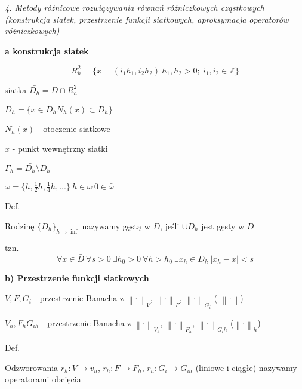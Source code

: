 \textit{4. Metody różnicowe rozwiązywania równań różniczkowych cząstkowych (konstrukcja siatek, przestrzenie funkcji siatkowych, aproksymacja operatorów różniczkowych)}

\textbf{a\) konstrukcja siatek}

\[R^{2}_{h} = \{ x = (i_{1}h_{1}, i_{2}h_{2})\ h_{1},h_{2} > 0;\ i_{1},i_{2} \in \mathbb{Z}\}\]

siatka $\bar{D_{h}} = D \cap R^{2}_{h}$

$D_{h} = \{ x \in \bar{D_{h}} N_h(x) \subset \bar{D_{h}}\}$

$N_h(x)$ - otoczenie siatkowe

$x$ - punkt wewnętrzny siatki

$\Gamma_h = \bar{D_h} \setminus D_h$

$\omega = \{h, \frac{1}{2}h, \frac{1}{4}h, ...\}\ h \in \omega\ 0 \in \bar{\omega}$

Def.

Rodzinę $\{D_h\}_{h \rightarrow \inf}$ nazywamy gęstą w $\bar{D}$, jeśli $\cup D_h$ jest gęsty w $\bar{D}$

tzn.
\[\forall x \in \bar{D}\ \forall s > 0\ \exists h_0 > 0\ \forall h > h_0\ \exists x_h \in D_h\ |x_h - x| < s\]

\textbf{b) Przestrzenie funkcji siatkowych}

$V, F, G_i$ - przestrzenie Banacha z $\left \| \cdot \right \|_V$, $\left \| \cdot \right \|_F$, $\left \| \cdot \right \|_{G_i}$ ( $\left \| \cdot \right \|$)

$V_h, F_h G_{ih}$ - przestrzenie Banacha z $\left \| \cdot \right \|_{V_h}$, $\left \| \cdot \right \|_{F_h}$, $\left \| \cdot \right \|_{G_ih}$ ($\left \| \cdot \right \|_h$)

Def.

Odzworowania $r_h: V \rightarrow v_h$, $r_h: F \rightarrow F_h$, $r_h: G_i \rightarrow G_{ih}$ (liniowe i ciągłe) nazywamy operatorami obcięcia